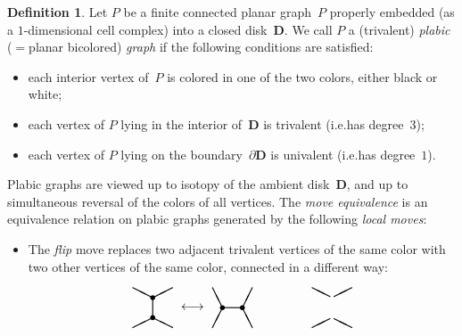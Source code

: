 \documentclass[10pt]{amsart}
\theoremstyle{definition}
\newtheorem{definition}[theorem]{Definition}
\newcommand{\ie}{i.e.}
\newcommand{\Disk}{{\mathbf{D}}}
\begin{document}
\begin{definition}
\label{def:plabic}
Let $P$ be a finite connected planar graph~$P$ properly embedded
(as a $1$-dimensional cell complex) into a closed disk~$\Disk$. 
We call $P$ a (trivalent) \emph{plabic} ($=$planar bicolored) \emph{graph}
if the following conditions are satisfied: 
\begin{itemize} %
\item
each interior vertex of~$P$ is colored in one of the two colors, either black or white; 
\item
each vertex of $P$ lying in the interior of~$\Disk$ is trivalent 
(\ie has degree~$3$);
\item 
each vertex of $P$ lying on the boundary~$\partial\Disk$ is univalent 
(\ie has degree~$1$). 
\end{itemize}
Plabic graphs are viewed up to isotopy of the ambient disk~$\Disk$, 
and up to simultaneous reversal of the colors of all vertices. 
The \emph{move equivalence} is an equivalence relation on plabic graphs 
generated by the following \emph{local moves}: 
\begin{itemize} %
\item The \emph{flip} move replaces two adjacent trivalent vertices of
 the same color with two other vertices of the same color, connected
 in a different way:
\[ 
\setlength{\unitlength}{0.8pt}
\begin{picture}(40,45)(0,0)
\thicklines
\put(0,0){\line(2,1){20}}
\put(20,30){\line(2,1){20}}
\put(0,40){\line(2,-1){20}}
\put(20,10){\line(2,-1){20}}
\put(20,10){\line(0,1){20}}
\put(20,10){\circle*{5}}
\put(20,30){\circle*{5}}
\end{picture}
\begin{picture}(40,40)(0,0)
\put(20,20){\makebox(0,0){$\longleftrightarrow$}}
\end{picture}
\begin{picture}(40,40)(0,0)
\thicklines
\put(0,0){\line(1,2){10}}
\put(30,20){\line(1,2){10}}
\put(40,0){\line(-1,2){10}}
\put(10,20){\line(-1,2){10}}
\put(10,20){\line(1,0){20}}
\put(10,20){\circle*{5}}
\put(30,20){\circle*{5}}
\end{picture}
\begin{picture}(60,40)(0,0)
\end{picture}
\begin{picture}(40,40)(0,0)
\thicklines
\put(0,0){\line(2,1){18}}
\put(40,40){\line(-2,-1){18}}
\put(0,40){\line(2,-1){18}}
\put(40,0){\line(-2,1){18}}

\end{picture}\]
\end{itemize}
\end{definition}
\end{document}
